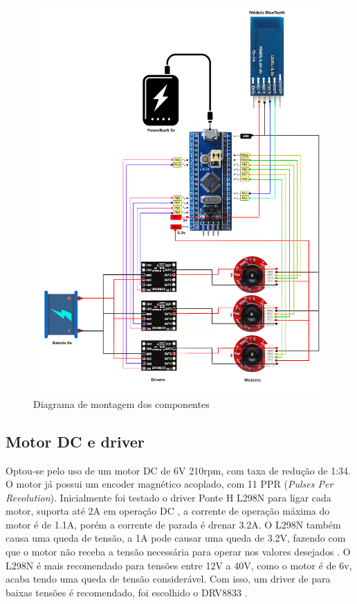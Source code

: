 \begin{figure}[h]
	\centering
	\includegraphics[width=1.0\textwidth]{figures/diagrama_montagem}
	\caption{Diagrama de montagem dos componentes}
	\label{fig:diagrama_montagem}
\end{figure}


\subsection{Motor DC e driver}
Optou-se pelo uso de um motor DC de 6V 210rpm, com taxa de redução de 1:34. O motor já possui um encoder magnético
acoplado, com 11 PPR (\textit{Pulses Per Revolution}). 
Inicialmente foi testado o driver Ponte H L298N para ligar cada motor, suporta até 2A em operação DC \cite{datasheel_l298n},
a corrente de operação máxima do motor é de 1.1A, porém a corrente de parada é drenar 3.2A. 
O L298N também causa uma queda de tensão, a 1A pode causar uma queda de 3.2V, fazendo com que o
motor não receba a tensão necessária para operar nos valores desejados \cite{datasheel_l298n}. 
O L298N é mais recomendado para tensões entre 12V a 40V, como o motor é de 6v, acaba tendo uma queda de tensão considerável.
Com isso, um driver de para baixas tensões é recomendado, foi escolhido o DRV8833 \cite{datasheel_dvr8833}.

